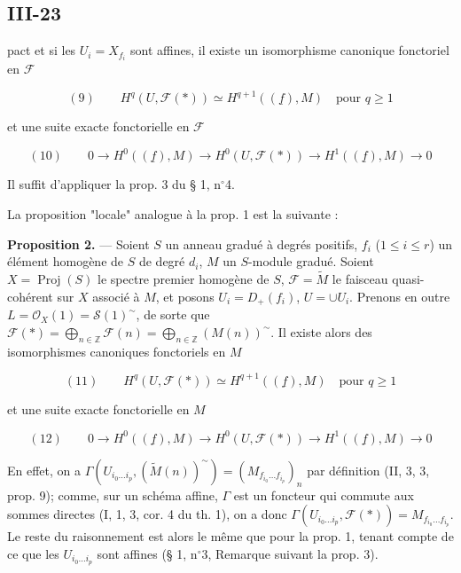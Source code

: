 \newpage


\subsection*{III-23}

pact et si les $U_i = X_{f_i}$ sont affines, il existe un isomorphisme canonique fonctoriel en $\mathcal{F}$

$$(9) \qquad H^q(U, \mathcal{F}(*)) \simeq H^{q+1}((\underline{f}), M) \quad \text{pour } q \ge 1$$

et une suite exacte fonctorielle en $\mathcal{F}$

$$(10) \qquad 0 \to H^0((\underline{f}), M) \to H^0(U, \mathcal{F}(*)) \to H^1((\underline{f}), M) \to 0$$

Il suffit d'appliquer la prop. 3 du § 1, n$^\circ$4.

La proposition "locale" analogue à la prop. 1 est la suivante :

\textbf{Proposition 2.} — Soient $S$ un anneau gradué à degrés positifs, $f_i$ ($1 \le i \le r$) un élément homogène de $S$ de degré $d_i$, $M$ un $S$-module gradué. Soient $X = \operatorname{Proj}(S)$ le spectre premier homogène de $S$, $\mathcal{F} = \tilde{M}$ le faisceau quasi-cohérent sur $X$ associé à $M$, et posons $U_i = D_+(f_i)$, $U = \cup U_i$. Prenons en outre $L = \mathcal{O}_X(1) = \mathcal{S}(1)^\sim$, de sorte que $\mathcal{F}(*) = \bigoplus_{n \in \mathbb{Z}} \mathcal{F}(n) = \bigoplus_{n \in \mathbb{Z}} (M(n))^\sim$. Il existe alors des isomorphismes canoniques fonctoriels en $M$

$$(11) \qquad H^q(U, \mathcal{F}(*)) \simeq H^{q+1}((\underline{f}), M) \quad \text{pour } q \ge 1$$

et une suite exacte fonctorielle en $M$

$$(12) \qquad 0 \to H^0((\underline{f}), M) \to H^0(U, \mathcal{F}(*)) \to H^1((\underline{f}), M) \to 0$$

En effet, on a $\Gamma(U_{i_0 \dots i_p}, (\tilde{M}(n))^\sim) = (M_{f_{i_0} \dots f_{i_p}})_n$ par définition (II, 3, 3, prop. 9); comme, sur un schéma affine, $\Gamma$ est un foncteur qui commute aux sommes directes (I, 1, 3, cor. 4 du th. 1), on a donc $\Gamma(U_{i_0 \dots i_p}, \mathcal{F}(*)) = M_{f_{i_0} \dots f_{i_p}}$. Le reste du raisonnement est alors le même que pour la prop. 1, tenant compte de ce que les $U_{i_0 \dots i_p}$ sont affines (§ 1, n$^\circ$3, Remarque suivant la prop. 3).

